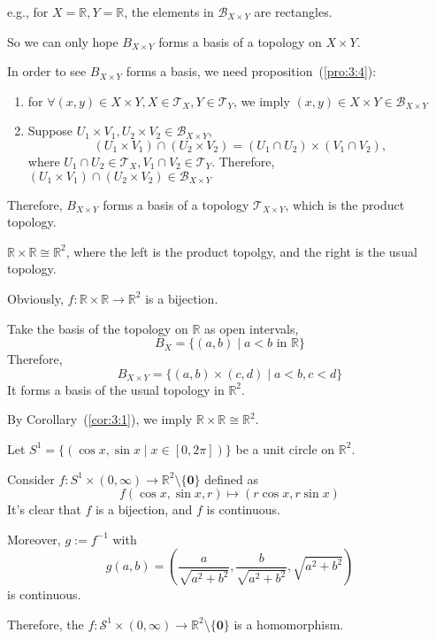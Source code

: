 e.g., for $X=\mathbb{R},Y=\mathbb{R}$, the elements in $\mathcal{B}_{X\times Y}$ are rectangles.

So we can only hope $B_{X\times Y}$ forms a basis of a topology on $X\times Y$.

In order to see $B_{X\times Y}$ forms a basis, we need proposition~(\ref{pro:3:4}):
\begin{enumerate}
\item
for $\forall (x,y)\in X\times Y, X\in\mathcal{T}_X,Y\in\mathcal{T}_Y$, we imply $(x,y)\in X\times Y\in\mathcal{B}_{X\times Y}$
\item
Suppose $U_1\times V_1,U_2\times V_2\in\mathcal{B}_{X\times Y}$,
\[
(U_1\times V_1)\cap(U_2\times V_2)=(U_1\cap U_2)\times (V_1\cap V_2),
\]
where $U_1\cap U_2\in\mathcal{T}_X,V_1\cap V_2\in\mathcal{T}_Y$. Therefore, $(U_1\times V_1)\cap(U_2\times V_2)\in\mathcal{B}_{X\times Y}$
\end{enumerate}
Therefore, $B_{X\times Y}$ forms a basis of a topology $\mathcal{T}_{X\times Y}$, which is the product topology.

\begin{example}
$\mathbb{R}\times\mathbb{R}\cong\mathbb{R}^2$, where the left is the product topolgy, and the right is the usual topology.

Obviously, $f:\mathbb{R}\times\mathbb{R}\to\mathbb{R}^2$ is a bijection.

Take the basis of the topology on $\mathbb{R}$ as open intervals,
\[
B_X=\{(a,b)\mid a<b\text{ in $\mathbb{R}$}\}
\]
Therefore, 
\[
B_{X\times Y}=\{(a,b)\times(c,d)\mid a<b,c<d\}
\]
It forms a basis of the usual topology in $\mathbb{R}^2$.

By Corollary~(\ref{cor:3:1}), we imply $\mathbb{R}\times\mathbb{R}\cong\mathbb{R}^2$.
\end{example}
\begin{example}
Let $S^1=\{(\cos x,\sin x\mid x\in[0,2\pi])\}$ be a unit circle on $\mathbb{R}^2$.

Consider $f: S^1\times(0,\infty)\to\mathbb{R}^2\setminus\{\bm0\}$ defined as
\[
f(\cos x,\sin x,r)\mapsto(r\cos x,r\sin x)
\]
It's clear that $f$ is a bijection, and $f$ is continuous. 

Moreover, $g:=f^{-1}$ with
\[
g(a,b)=(\frac{a}{\sqrt{a^2+b^2}},\frac{b}{\sqrt{a^2+b^2}},\sqrt{a^2+b^2})
\]
is continuous.

Therefore, the $f:\mathcal{S}^1\times(0,\infty)\to\mathbb{R}^2\setminus\{\bm0\}$ is a homomorphism.
\end{example}
















